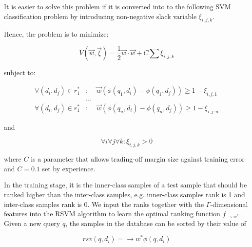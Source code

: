 It is easier to solve this problem if it is converted into to the following SVM classification problem by introducing non-negative slack variable $\xi_{i,j,k}$.

Hence, the problem is to minimize:

\begin{equation}
V(\overrightarrow{w},\overrightarrow{\xi})=\frac{1}{2}\overrightarrow{w}\cdot\overrightarrow{w}+C\sum \xi_{i,j,k}
\end{equation}

subject to:

\begin{eqnarray}
\forall (d_i,d_j) \in r_1^* &:& \overrightarrow{w} \left(\phi(q_1,d_i)-\phi(q_1,d_j)\right)\geq 1- \xi_{i,j,1}\\
&\dots&\\
\forall (d_i,d_j) \in r_1^* &:& \overrightarrow{w} \left(\phi(q_n,d_i)-\phi(q_n,d_j)\right)\geq 1- \xi_{i,j,n}
\end{eqnarray}

and

\begin{equation}
\forall i \forall j \forall k : \xi_{i,j,k}>0
\end{equation}

where $C$ is a parameter that allows trading-off margin size against training error and $C=0.1$ set by experience.

In the training stage, it is the inner-class samples of a test sample that should be ranked higher than the inter-class samples, e.g. inner-class samples rank is 1 and inter-class samples rank is 0. We input the ranks together with the $\Gamma$-dimensional features into the RSVM algorithm to learn the optimal ranking function $f_{\rightarrow{w}^*}$. Given a new query $q$, the samples in the database can be sorted by their value of

\begin{equation}
rsv(q,d_i)=\rightarrow{w}^*\phi(q,d_i)
\end{equation}
